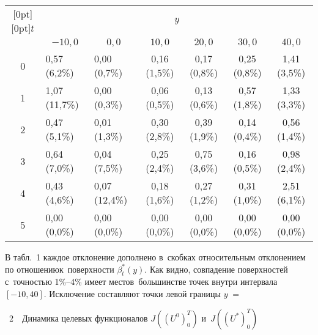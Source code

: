 \begin{multicols}{2}
\begin{table*}
\begin{center}
\begin{tabular}{|c|l|l|c|c|c|c|}
\hline
\multicolumn{1}{|c|}{\raisebox{-6pt}[0pt][0pt]{$t$}}&\multicolumn{6}{c|}{$y$}\\
\cline{2-7}
&\multicolumn{1}{c|}{$-10{,}0$}&\multicolumn{1}{c|}{$0{,}0$}&$10{,}0$&$20{,}0$&$30{,}0$&$40{,}0$\\
\hline
0&0,57 (6,2\%)&0,00 (0,7\%)&0,16 (1,5\%)&0,17 (0,8\%)&0,25 (0,8\%)&1,41 (3,5\%)\\
1&1,07 (11,7\%)&0,00 (0,3\%)&0,06 (0,5\%)&0,13 (0,6\%)&0,57 (1,8\%)&1,33 (3,3\%)\\
2&0,47 (5,1\%)&0,01 (1,3\%)&0,30 (2,8\%)&0,39 (1,9\%)&0,14 (0,4\%)&0,56 (1,4\%)\\
3&0,64 (7,0\%)&0,04 (7,5\%)&0,25 (2,4\%)&0,75 (3,6\%)&0,16 (0,5\%)&0,98 (2,4\%)\\
4&0,43 (4,6\%)&0,07 (12,4\%)&0,18 (1,6\%)&0,27 (1,2\%)&0,31 (1,0\%)&2,51 (6,1\%)\\
5&0,00 (0,0\%)&0,00 (0,0\%)&0,00 (0,0\%)&0,00 (0,0\%)&0,00 (0,0\%)&0,00 (0,0\%)\\
\hline
\end{tabular}
\end{center}
\vspace*{-6pt}
\end{table*}
     
     В табл.~1 каждое отклонение дополнено в~скобках относительным 
отклонением по отношению\linebreak к~поверхности $\beta_t^*(y)$. Как видно, 
совпадение поверхностей с~точностью 1\%--4\% имеет место\linebreak в~большинстве 
точек внут\-ри интервала $[-10,40]$.
Исключение составляют точки левой 
границы $y\;=$\linebreak\vspace*{-12pt}

\pagebreak


\noindent
{{\tablename~2}\ \ \small{Динамика целевых функционалов $J((U^0)_0^T)$ и~$J((U^*)_0^T)$ }}

\vspace*{3pt}


\end{multicols}
